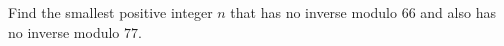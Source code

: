 Find the smallest positive integer $n$ that has no inverse modulo $66$ and also has no inverse modulo $77$.
